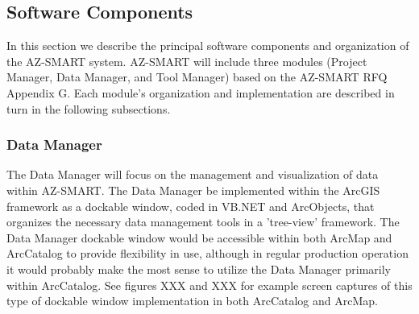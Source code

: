 \subsection{Software Components}

In this section we describe the principal software components and organization of the AZ-SMART system.  AZ-SMART will include three modules (Project Manager, Data Manager, and Tool Manager) based on the AZ-SMART RFQ Appendix G. Each module's organization and implementation are described in turn in the following subsections.



\subsubsection{Data Manager}

The Data Manager will focus on the management and visualization of data within AZ-SMART.  The Data Manager be implemented within the ArcGIS framework as a dockable window, coded in VB.NET and ArcObjects, that organizes the necessary data management tools in a 'tree-view' framework.  The Data Manager dockable window would be accessible within both ArcMap and ArcCatalog to provide flexibility in use, although in regular production operation it would probably make the most sense to utilize the Data Manager primarily within ArcCatalog.  See figures XXX and XXX for example screen captures of this type of dockable window implementation in both ArcCatalog and ArcMap. 


